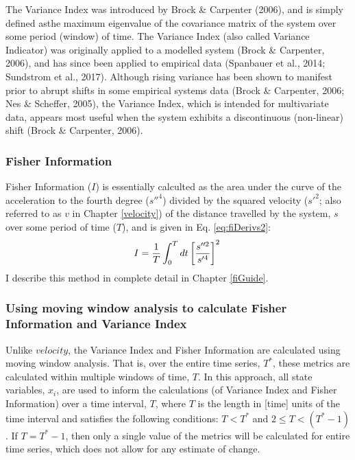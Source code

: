 \documentclass[12pt,twoside,openany]{reedthesis}
\begin{document}
The Variance Index was introduced by Brock \& Carpenter (2006), and is simply defined asthe maximum eigenvalue of the covariance matrix of the system over some period (window) of time. The Variance Index (also called Variance Indicator) was originally applied to a modelled system (Brock \& Carpenter, 2006), and has since been applied to empirical data (Spanbauer et al., 2014; Sundstrom et al., 2017). Although rising variance has been shown to manifest prior to abrupt shifts in some empirical systems data (Brock \& Carpenter, 2006; Nes \& Scheffer, 2005), the Variance Index, which is intended for multivariate data, appears most useful when the system exhibits a discontinuous (non-linear) shift (Brock \& Carpenter, 2006).

\hypertarget{fisher-information}{%
\subsubsection{Fisher Information}\label{fisher-information}}

Fisher Information (\(I\)) is essentially calculted as the area under the curve of the acceleration to the fourth degree (\(s''^4\)) divided by the squared velocity (\(s'^2\); also referred to as \(v\) in Chapter \ref{velocity}) of the distance travelled by the system, \(s\) over some period of time (\(T\)), and is given in Eq. \eqref{eq:fiDerivs2}:
\begin{equation}   
    I = \frac{1}{T} \int_0^T dt\left[\frac{s''^2}{s'^4}\right]^2 \\  
  \label{eq:fiDerivs2}  
\end{equation}
I describe this method in complete detail in Chapter \ref{fiGuide}.

\hypertarget{using-moving-window-analysis-to-calculate-fisher-information-and-variance-index}{%
\subsubsection{Using moving window analysis to calculate Fisher Information and Variance Index}\label{using-moving-window-analysis-to-calculate-fisher-information-and-variance-index}}

Unlike \(velocity\), the Variance Index and Fisher Information are calculated using moving window analysis. That is, over the entire time series, \(T^*\), these metrics are calculated within multiple windows of time, \(T\). In this approach, all state variables, \(x_i\), are used to inform the calculations (of Variance Index and Fisher Information) over a time interval, \(T\), where \(T\) is the length in {[}time{]} units of the time interval and satisfies the following conditions: \(T < T^*\) and \(2\leq T < (T^*-1)\). If \(T = T^*-1\), then only a single value of the metrics will be calculated for entire time series, which does not allow for any estimate of change.
\end{document}
